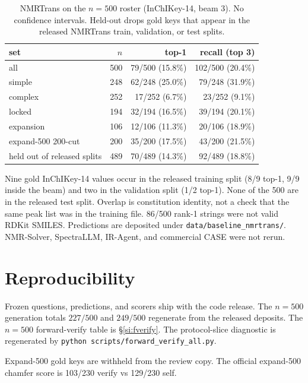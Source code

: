 \documentclass[11pt]{article}
\begin{document}
\begin{table}[h]
\caption{NMRTrans on the $n{=}500$ roster (InChIKey-14, beam 3).
No confidence intervals.
Held-out drops gold keys that appear in the released NMRTrans
train, validation, or test splits.}
\centering
\small
\begin{tabular}{@{}lrrr@{}}
\toprule
set & $n$ & top-1 & recall (top 3) \\
\midrule
all & 500 & 79/500 (15.8\%) & 102/500 (20.4\%) \\
simple & 248 & 62/248 (25.0\%) & 79/248 (31.9\%) \\
complex & 252 & 17/252 (6.7\%) & 23/252 (9.1\%) \\
locked & 194 & 32/194 (16.5\%) & 39/194 (20.1\%) \\
expansion & 106 & 12/106 (11.3\%) & 20/106 (18.9\%) \\
expand-500 200-cut & 200 & 35/200 (17.5\%) & 43/200 (21.5\%) \\
held out of released splits & 489 & 70/489 (14.3\%) & 92/489 (18.8\%) \\
\bottomrule
\end{tabular}
\end{table}

Nine gold InChIKey-14 values occur in the released training split
(8/9 top-1, 9/9 inside the beam) and two in the validation split
(1/2 top-1).
None of the 500 are in the released test split.
Overlap is constitution identity, not a check that the same peak list
was in the training file.
86/500 rank-1 strings were not valid RDKit SMILES.
Predictions are deposited under \texttt{data/baseline\_nmrtrans/}.
NMR-Solver, SpectraLLM, IR-Agent, and commercial CASE were not rerun.

\section{Reproducibility}
\label{si:repro}

Frozen questions, predictions, and scorers ship with the code release.
The $n{=}500$ generation totals $227/500$ and $249/500$ regenerate from
the released deposits.
The $n{=}500$ forward-verify table is \S\ref{si:fverify}.
The protocol-slice diagnostic is regenerated by
\texttt{python scripts/forward\_verify\_all.py}.

Expand-500 gold keys are withheld from the review copy.
The official expand-500 chamfer score is 103/230 verify vs 129/230 self.
\end{document}
